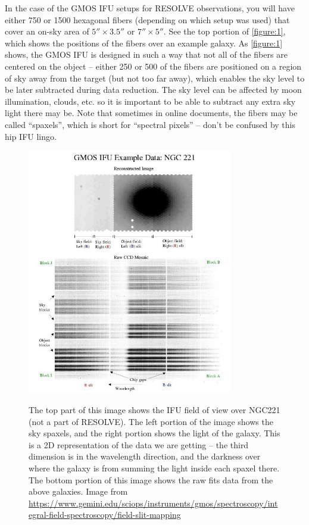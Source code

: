 \documentclass[12pt]{report}
\begin{document}
In the case of the GMOS IFU setups for RESOLVE observations, you will have either 750 or 1500 hexagonal fibers (depending on which setup was used) that cover an on-sky area of $5''\times3.5''$ or $7''\times5''$. See the top portion of \autoref{figure:1}, which shows the positions of the fibers over an example galaxy. As \autoref{figure:1} shows, the GMOS IFU is designed in such a way that not all of the fibers are centered on the object -- either 250 or 500 of the fibers are positioned on a region of sky away from the target (but not too far away), which enables the sky level to be later subtracted during data reduction. The sky level can be affected by moon illumination, clouds, etc. so it is important to be able to subtract any extra sky light there may be. Note that sometimes in online documents, the fibers may be called ``spaxels'', which is short for ``spectral pixels'' -- don't be confused by this hip IFU lingo.

\begin{figure}[h]
\centering
\includegraphics[width=0.8\textwidth]{fiber_examples.jpeg}
\label{figure:1}
\caption[IFU Fibers and Data Format]{The top part of this image shows the IFU field of view over NGC221 (not a part of RESOLVE). The left portion of the image shows the sky spaxels, and the right portion shows the light of the galaxy. This is a 2D representation of the data we are getting -- the third dimension is in the wavelength direction, and the darkness over where the galaxy is from summing the light inside each spaxel there. The bottom portion of this image shows the raw fits data from the above galaxies.  \footnotesize{Image from \url{https://www.gemini.edu/sciops/instruments/gmos/spectroscopy/integral-field-spectroscopy/field-slit-mapping}}}
\end{figure}
\end{document}
